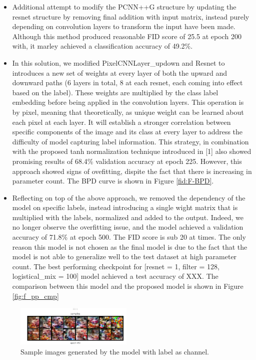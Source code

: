 \documentclass{article}
\begin{document}
\begin{itemize}
    \item Additional attempt to modify the PCNN++G structure by updating the resnet structure by removing final addition with input matrix, instead purely depending on convolution layers to transform the input have been made. Although this method produced reasonable FID score of 25.5 at epoch 200 with, it marley achieved a classification accuracy of 49.2\%. 
    \item In this solution, we modified PixelCNNLayer\_up\/down and Resnet to introduces a new set of weights at every layer of both the upward and downward paths (6 layers in total, 8 at each resnet, each coming into effect based on the label). These weights are multiplied by the class label embedding before being applied in the convolution layers. This operation is by pixel, meaning that theoretically, as unique weight can be learned about each pixel at each layer. It will establish a stronger correlation between specific components of the image and its class at every layer to address the difficulty of model capturing label information. This strategy, in combination with the proposed tanh normalization technique introduced in [1] also showed promising results of 68.4\% validation accuracy at epoch 225. However, this approach showed signs of ovefitting, dispite the fact that there is increasing in parameter count. The BPD curve is shown in Figure \ref{fid:F-BPD}. 
    \item Reflecting on top of the above approach, we removed the dependency of the model on specific labels, instead introducing a single wight matrix that is multiplied with the labels, normalized and added to the output. Indeed, we no longer observe the overfitting issue, and the model achieved a validation accuracy of 71.8\% at epoch 500. The FID score is sub 20 at times. The only reason this model is not chosen as the final model is due to the fact that the model is not able to generalize well to the test dataset at high parameter count. The best performing checkpoint for [resnet = 1, filter = 128, logistical\_mix = 100] model achieved a test accuracy of XXX. The comparison between this model and the proposed model is shown in Figure \ref{fig:f_pp_cmp}
\end{itemize}

\begin{figure}
    \centering
    \includegraphics[width=0.5\textwidth]{report_data/f-lc-samples.png}
    \caption{ Sample images generated by the model with label as channel.}
    \label{fig:f-lc-samples}
\end{figure}
\end{document}
